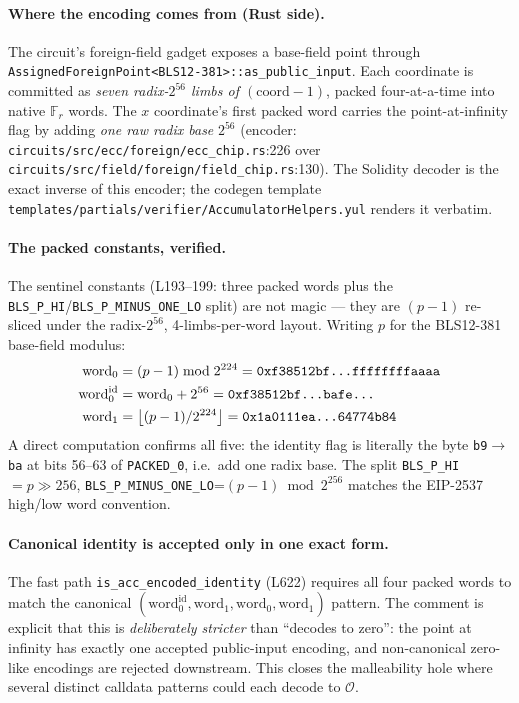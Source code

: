 \paragraph{Where the encoding comes from (Rust side).}
The circuit's foreign-field gadget exposes a base-field point
through \texttt{AssignedForeignPoint<BLS12-381>::as\_public\allowbreak\_input}.
Each coordinate is committed as \emph{seven radix-$2^{56}$ limbs
of $(\text{coord}-1)$}, packed four-at-a-time into native
$\mathbb{F}_r$ words. The $x$ coordinate's first packed word
carries the point-at-infinity flag by adding \emph{one raw radix
base} $2^{56}$ (encoder: \texttt{circuits/\allowbreak{}src/\allowbreak{}ecc/\allowbreak{}foreign/\allowbreak{}ecc\_\allowbreak{}chip.rs}:226
over \texttt{circuits/\allowbreak{}src/\allowbreak{}field/\allowbreak{}foreign/\allowbreak{}field\_\allowbreak{}chip.rs}:130). The
Solidity decoder is the exact inverse of this encoder; the codegen template
\texttt{templates/partials/verifier/Accumulator\allowbreak Helpers.yul}
renders it verbatim.

\paragraph{The packed constants, verified.}
The sentinel constants (L193--199: three packed words plus the
\texttt{BLS\_P\_HI}/\texttt{BLS\_\allowbreak{}P\_\allowbreak{}MINUS\_\allowbreak{}ONE\_\allowbreak{}LO} split) are not
magic --- they are $(p-1)$ re-sliced under the radix-$2^{56}$,
4-limbs-per-word layout. Writing $p$ for the BLS12-381 base-field modulus:
\begin{align}
\text{word}_0 &= (p-1) \bmod 2^{224}
  = \texttt{0x\allowbreak f38512bf\ldots ffffffffaaaa} \\
\text{word}_0^{\text{id}} &= \text{word}_0 + 2^{56}
  = \texttt{0x\allowbreak f38512bf\ldots bafe\ldots} \\
\text{word}_1 &= \big\lfloor (p-1)/2^{224} \big\rfloor
  = \texttt{0x\allowbreak 1a0111ea\ldots 64774b84}
\end{align}
A direct computation confirms all five: the identity flag is
literally the byte \texttt{b9}$\to$\texttt{ba} at bits 56--63 of
\texttt{PACKED\_0}, i.e.\ add one radix base. The split
\texttt{BLS\_P\_HI}$=p\gg256$,
\texttt{BLS\_\allowbreak{}P\_\allowbreak{}MINUS\_\allowbreak{}ONE\_\allowbreak{}LO}=$(p-1)\bmod 2^{256}$ matches the
EIP-2537 high/low word convention.

\paragraph{Canonical identity is accepted only in one exact form.}
The fast path \texttt{is\_\allowbreak{}acc\_\allowbreak{}encoded\_\allowbreak{}identity} (L622) requires
all four packed words to match the canonical
$(\text{word}_0^{\text{id}}, \text{word}_1, \text{word}_0, \text{word}_1)$
pattern. The comment is explicit that this is
\emph{deliberately stricter} than ``decodes to zero'': the point
at infinity has exactly one accepted public-input encoding, and
non-canonical zero-like encodings are rejected downstream. This
closes the malleability hole where several distinct calldata
patterns could each decode to $\mathcal{O}$.

